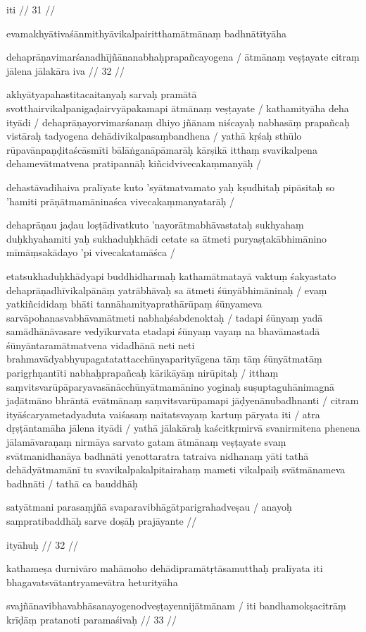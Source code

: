 iti  // 31  //

evamakhyātivaśānmithyāvikalpairitthamātmānaṃ badhnātītyāha

dehaprāṇavimarśanadhījñānanabhaḥprapañcayogena  /
ātmānaṃ veṣṭayate citraṃ jālena jālakāra iva  // 32  //

akhyātyapahastitacaitanyaḥ sarvaḥ pramātā svotthairvikalpanigaḍairvyāpakamapi ātmānaṃ veṣṭayate  / kathamityāha deha ityādi  / dehaprāṇayorvimarśanaṃ dhiyo jñānam niścayaḥ nabhasāṃ prapañcaḥ vistāraḥ tadyogena dehādivikalpasaṃbandhena  / yathā kṛśaḥ sthūlo rūpavānpaṇḍitaścāsmīti bālāṅganāpāmarāḥ kārṣikā itthaṃ svavikalpena dehamevātmatvena pratipannāḥ kiñcidvivecakaṃmanyāḥ  /

dehastāvadihaiva pralīyate kuto 'syātmatvamato yaḥ kṣudhitaḥ pipāsitaḥ so 'hamiti prāṇātmamāninaśca vivecakaṃmanyatarāḥ  /

dehaprāṇau jaḍau loṣṭādivatkuto 'nayorātmabhāvastataḥ sukhyahaṃ duḥkhyahamiti yaḥ sukhaduḥkhādi cetate sa ātmeti puryaṣṭakābhimānino mīmāṃsakādayo 'pi vivecakatamāśca  /

etatsukhaduḥkhādyapi buddhidharmaḥ kathamātmatayā vaktuṃ śakyastato dehaprāṇadhīvikalpānāṃ yatrābhāvaḥ sa ātmeti śūnyābhimāninaḥ  / evaṃ yatkiñcididaṃ bhāti tannāhamityaprathārūpaṃ śūnyameva sarvāpohanasvabhāvamātmeti nabhaḥśabdenoktaḥ  / tadapi śūnyaṃ yadā samādhānāvasare vedyīkurvata etadapi śūnyaṃ vayaṃ na bhavāmastadā śūnyāntaramātmatvena vidadhānā neti neti brahmavādyabhyupagatatattacchūnyaparityāgena tāṃ tāṃ śūnyātmatāṃ parigṛhṇantīti nabhaḥprapañcaḥ kārikāyāṃ nirūpitaḥ  / itthaṃ saṃvitsvarūpāparyavasānācchūnyātmamānino yoginaḥ suṣuptaguhānimagnā jaḍātmāno bhrāntā evātmānaṃ saṃvitsvarūpamapi jāḍyenānubadhnanti  / citram ityāścaryametadyaduta vaiśasaṃ naitatsvayaṃ kartuṃ pāryata iti  / atra dṛṣṭāntamāha jālena ityādi  / yathā jālakāraḥ kaścitkṛmirvā svanirmitena phenena jālamāvaraṇaṃ nirmāya sarvato gatam ātmānaṃ veṣṭayate svaṃ svātmanidhanāya badhnāti yenottaratra tatraiva nidhanaṃ yāti tathā dehādyātmamānī tu svavikalpakalpitairahaṃ mameti vikalpaiḥ svātmānameva badhnāti  / tathā ca bauddhāḥ

satyātmani parasaṃjñā svaparavibhāgātparigrahadveṣau  /
anayoḥ saṃpratibaddhāḥ sarve doṣāḥ prajāyante  //

ityāhuḥ  // 32  //

kathameṣa durnivāro mahāmoho dehādipramātṛtāsamutthaḥ pralīyata iti bhagavatsvātantryamevātra heturityāha

svajñānavibhavabhāsanayogenodveṣṭayennijātmānam  /
iti bandhamokṣacitrāṃ krīḍāṃ pratanoti paramaśivaḥ  // 33  //

